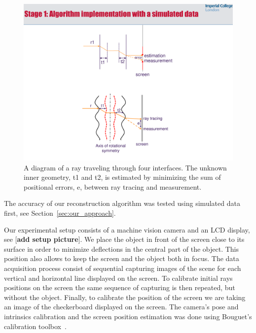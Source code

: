 \documentclass[10pt,twocolumn,letterpaper]{article}
\begin{document}
\begin{figure}
  \centering
	\includegraphics[width=1\linewidth]{figure/ray_dia1.pdf}	
  \caption{A diagram of a ray traveling through four interfaces. The unknown inner geometry, t1 and t2, is estimated by minimizing the sum of positional errors, e, between ray tracing and measurement.}
  \label{ray_dia}
\end{figure}

The accuracy of our reconstruction algorithm was tested using simulated data first, see Section~\ref{sec:our_approach}.

Our experimental setup consists of a machine vision camera and an LCD display, see [{\bf{add setup picture}}]. We place the object
in front of the screen close to its surface in order to minimize deflections in the central part of the object. This position
also allows to keep the screen and the object both in focus. The data acquisition process consist of sequential capturing images of the scene for each vertical and horizontal line displayed on the screen. To calibrate initial rays positions on the screen the
same sequence of capturing is then repeated, but without the object. Finally, to calibrate the position of the screen we are taking an image of the checkerboard displayed on the screen. The camera's pose and intrinsics calibration and the screen position estimation was done using Bouguet’s calibration toolbox~\cite{CalibToolbox}.
\end{document}
